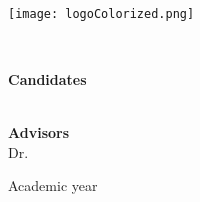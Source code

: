 \begin{center}
    \begin{spacing}{2} %
       \textbf{\large {\University}}\\
    \end{spacing}

    \texttt{[image: logoColorized.png]}
    
    \begin{spacing}{2} %
      \textbf{\large {\Course}}\\
    \end{spacing}

    \vspace{1cm} %

    \begin{spacing}{2.4} %
      \textbf{\LARGE {\thesisTitle}}
    \end{spacing}
  
    \vspace{2cm} %
  
    \begin{spacing}{1.5} %
      \textbf{\large {Candidates}}\\
      {\large \thesisAuthor}\\
    \end{spacing}

    \vspace{0.5cm} %

    \begin{spacing}{1.5} %
      \textbf {\large {Advisors}} \\
      {\large {Dr. \supervisor}}\\
    \end{spacing}

    \vfill
    \begin{center}
      {\large Academic year \thesisDate}
    \end{center}
\end{center}